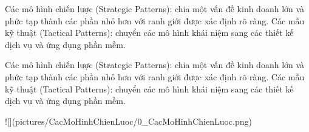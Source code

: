 Các mô hình chiến lược (Strategic Patterns): chia một vấn đề kinh doanh lớn và phức tạp thành các phần nhỏ hơn với ranh giới được xác định rõ ràng.
Các mẫu kỹ thuật (Tactical Patterns): chuyển các mô hình khái niệm sang các thiết kế dịch vụ và ứng dụng phần mềm.




Các mô hình chiến lược (Strategic Patterns): chia một vấn đề kinh doanh lớn và phức tạp thành các phần nhỏ hơn với ranh giới được xác định rõ ràng.
Các mẫu kỹ thuật (Tactical Patterns): chuyển các mô hình khái niệm sang các thiết kế dịch vụ và ứng dụng phần mềm.



![](pictures/CacMoHinhChienLuoc/0_CacMoHinhChienLuoc.png)






